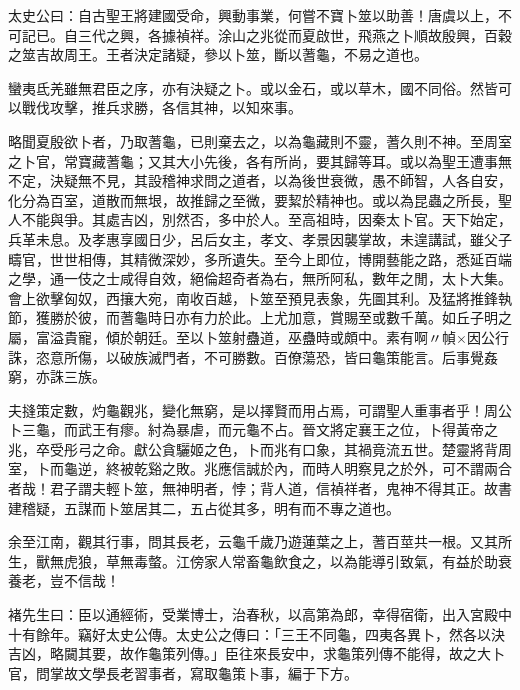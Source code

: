 
\begin{pinyinscope}
太史公曰：自古聖王將建國受命，興動事業，何嘗不寶卜筮以助善！唐虞以上，不可記已。自三代之興，各據禎祥。涂山之兆從而夏啟世，飛燕之卜順故殷興，百穀之筮吉故周王。王者決定諸疑，參以卜筮，斷以蓍龜，不易之道也。

蠻夷氐羌雖無君臣之序，亦有決疑之卜。或以金石，或以草木，國不同俗。然皆可以戰伐攻擊，推兵求勝，各信其神，以知來事。

略聞夏殷欲卜者，乃取蓍龜，已則棄去之，以為龜藏則不靈，蓍久則不神。至周室之卜官，常寶藏蓍龜；又其大小先後，各有所尚，要其歸等耳。或以為聖王遭事無不定，決疑無不見，其設稽神求問之道者，以為後世衰微，愚不師智，人各自安，化分為百室，道散而無垠，故推歸之至微，要絜於精神也。或以為昆蟲之所長，聖人不能與爭。其處吉凶，別然否，多中於人。至高祖時，因秦太卜官。天下始定，兵革未息。及孝惠享國日少，呂后女主，孝文、孝景因襲掌故，未遑講試，雖父子疇官，世世相傳，其精微深妙，多所遺失。至今上即位，博開藝能之路，悉延百端之學，通一伎之士咸得自效，絕倫超奇者為右，無所阿私，數年之閒，太卜大集。會上欲擊匈奴，西攘大宛，南收百越，卜筮至預見表象，先圖其利。及猛將推鋒執節，獲勝於彼，而蓍龜時日亦有力於此。上尤加意，賞賜至或數千萬。如丘子明之屬，富溢貴寵，傾於朝廷。至以卜筮射蠱道，巫蠱時或頗中。素有啊〃幀×因公行誅，恣意所傷，以破族滅門者，不可勝數。百僚蕩恐，皆曰龜策能言。后事覺姦窮，亦誅三族。

夫摓策定數，灼龜觀兆，變化無窮，是以擇賢而用占焉，可謂聖人重事者乎！周公卜三龜，而武王有瘳。紂為暴虐，而元龜不占。晉文將定襄王之位，卜得黃帝之兆，卒受彤弓之命。獻公貪驪姬之色，卜而兆有口象，其禍竟流五世。楚靈將背周室，卜而龜逆，終被乾谿之敗。兆應信誠於內，而時人明察見之於外，可不謂兩合者哉！君子謂夫輕卜筮，無神明者，悖；背人道，信禎祥者，鬼神不得其正。故書建稽疑，五謀而卜筮居其二，五占從其多，明有而不專之道也。

余至江南，觀其行事，問其長老，云龜千歲乃遊蓮葉之上，蓍百莖共一根。又其所生，獸無虎狼，草無毒螫。江傍家人常畜龜飲食之，以為能導引致氣，有益於助衰養老，豈不信哉！

褚先生曰：臣以通經術，受業博士，治春秋，以高第為郎，幸得宿衛，出入宮殿中十有餘年。竊好太史公傳。太史公之傳曰：「三王不同龜，四夷各異卜，然各以決吉凶，略闚其要，故作龜策列傳。」臣往來長安中，求龜策列傳不能得，故之大卜官，問掌故文學長老習事者，寫取龜策卜事，編于下方。


\end{pinyinscope}
